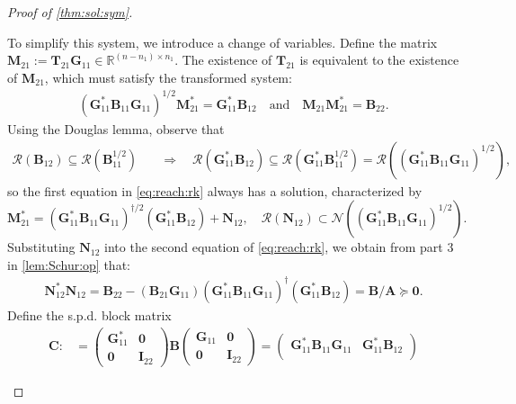 \documentclass[noinfoline]{imsart}\setcounter{tocdepth}{2}
\renewcommand{\b}[1]{\mathbb{#1}} %
\newcommand{\m}[1]{\mathbf{#1}} %
\renewcommand{\c}[1]{\mathcal{#1}} %
\theoremstyle{plain}
\begin{document}
\begin{proof}[Proof of \cref{thm:sol:sym}]
\begin{enumerate}[leftmargin=*]
To simplify this system, we introduce a change of variables.
Define the matrix $\m{M}_{21} := \m{T}_{21} \m{G}_{11} \in \b{R}^{(n-n_{1}) \times n_{1}}$. The existence of $\m{T}_{21}$ is equivalent to the existence of $\m{M}_{21}$, which must satisfy the transformed system:
\begin{align}\label{eq:reach:rk}
    (\m{G}_{11}^{*} \m{B}_{11} \m{G}_{11})^{1/2} \m{M}_{21}^{*} = \m{G}_{11}^{*} \m{B}_{12} \quad \text{and} \quad \m{M}_{21} \m{M}_{21}^{*} = \m{B}_{22}.
\end{align}
Using the Douglas lemma, observe that
\begin{align*}
    \c{R}(\m{B}_{12}) \subseteq \c{R}(\m{B}_{11}^{1/2}) \quad &\Longrightarrow \quad \c{R}(\m{G}_{11}^{*} \m{B}_{12}) \subseteq \c{R}(\m{G}_{11}^{*} \m{B}_{11}^{1/2}) = \c{R}((\m{G}_{11}^{*} \m{B}_{11} \m{G}_{11})^{1/2}),
\end{align*}
so the first equation in \eqref{eq:reach:rk} always has a solution, characterized by
\begin{equation}\label{eq:sol:decomp}
    \m{M}_{21}^{*} = (\m{G}_{11}^{*} \m{B}_{11} \m{G}_{11})^{\dagger/2} (\m{G}_{11}^{*} \m{B}_{12}) + \m{N}_{12}, \quad \c{R}(\m{N}_{12}) \subset \c{N}((\m{G}_{11}^{*} \m{B}_{11} \m{G}_{11})^{1/2}).
\end{equation}
Substituting $\m{N}_{12}$ into the second equation of \eqref{eq:reach:rk}, we obtain from part 3 in \cref{lem:Schur:op} that:
\begin{align}\label{eq:sol:resi}
    \m{N}_{12}^{*} \m{N}_{12} = \m{B}_{22} - (\m{B}_{21} \m{G}_{11}) (\m{G}_{11}^{*} \m{B}_{11} \m{G}_{11})^{\dagger} (\m{G}_{11}^{*} \m{B}_{12}) = \m{B}/\m{A} \succeq \m{0}.
\end{align}
Define the s.p.d. block matrix
\begin{align*}
    \m{C} :&= \begin{pmatrix}
        \m{G}_{11}^{*} & \m{0} \\
        \m{0} & \m{I}_{22}
    \end{pmatrix}
    \m{B} \begin{pmatrix}
        \m{G}_{11} & \m{0} \\
        \m{0} & \m{I}_{22}
    \end{pmatrix} = \begin{pmatrix}
        \m{G}_{11}^{*} \m{B}_{11} \m{G}_{11} & \m{G}_{11}^{*} \m{B}_{12} \\

\end{pmatrix}
\end{align*}
\end{enumerate}
\end{proof}
\end{document}
